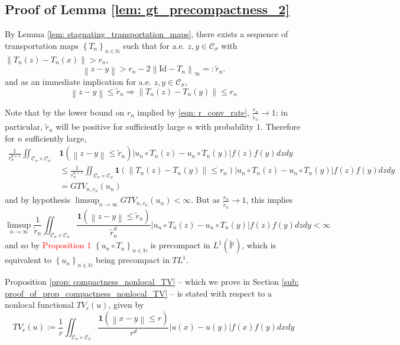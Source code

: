 \documentclass{article}
\newcommand{\norm}[1]{\left\lVert#1\right\rVert}
\newcommand{\abs}[1]{\left \lvert #1 \right \rvert}
\newcommand{\set}[1]{\left\{#1\right\}}
\newcommand{\seq}[1]{\set{#1}_{n \in \N}}
\newcommand{\N}{\mathbb{N}}
\newcommand{\Cset}{\mathcal{C}}
\newcommand{\Csig}{\Cset_{\sigma}}
\newcommand{\Pbb}{\mathbb{P}}
\newcommand{\1}{\mathbf{1}}
\theoremstyle{alden}
\theoremstyle{aldenthm}
\theoremstyle{remark}
\begin{document}
\subsection{Proof of Lemma \ref{lem: gt_precompactness_2}}
By Lemma \ref{lem: stagnating_transportation_maps}, there exists a sequence of transportation maps $\seq{T_n}$ such that for a.e. $z,y \in \Csig$ with $\norm{T_n(z) - T_n(x)} > r_n$,
\begin{equation*}
\norm{z - y} > r_n - 2 \norm{\mathrm{Id} - T_n}_{\infty} =: \widetilde{r}_n.
\end{equation*}
and as an immediate implication for a.e. $z,y \in \Csig$,
\begin{equation*}
\norm{z - y} \leq \widetilde{r}_n \Longrightarrow \norm{T_n(z) - T_n(y)} \leq r_n
\end{equation*}

Note that by the lower bound on $r_n$ implied by \eqref{eqn: r_conv_rate}, $\frac{r_n}{\widetilde{r}_n} \to 1$; in particular, $\widetilde{r}_n$ will be positive for sufficiently large $n$ with probability $1$. Therefore for $n$ sufficiently large,
\begin{align*}
\frac{1}{r_n^{d+1}} \iint_{\Csig \times \Csig} & \1(\norm{z - y} \leq \widetilde{r}_n) \abs{u_n \circ T_n(z) - u_n \circ T_n(y)} f(z) f(y) dz dy \\
& \leq \frac{1}{r_n^{d+1}} \iint_{\Csig \times \Csig} \1(\norm{T_n(z) - T_n(y)} \leq r_n) \abs{u_n \circ T_n(z) - u_n \circ T_n(y)} f(z) f(y) dz dy \\
& = GTV_{n,r_n}(u_n)
\end{align*} 
and by hypothesis $\limsup_{n \to \infty} GTV_{n,r_n}(u_n) < \infty$.  But as $\frac{r_n}{\widetilde{r}_n} \to 1$, this implies
\begin{equation*}
\limsup_{n \to \infty} \frac{1}{\widetilde{r}_n} \iint_{\Csig \times \Csig} \frac{\1(\norm{z - y} \leq \widetilde{r}_n)}{\widetilde{r}_n^d} \abs{u_n \circ T_n(z) - u_n \circ T_n(y)} f(z) f(y) dz dy < \infty
\end{equation*}
and so by \textcolor{red}{Proposition 1} $\seq{u_n \circ T_n}$ is precompact in $L^1(\widetilde{\Pbb})$, which is equivalent to $\seq{u_n}$ being precompact in $TL^1$. 

Proposition \ref{prop: compactness_nonlocal_TV} -- which we prove in Section \ref{sub: proof_of_prop_compactness_nonlocal_TV} --  is stated with respect to a nonlocal functional $TV_r(u)$, given by
\begin{equation*}
TV_r(u) := \frac{1}{r} \iint_{\Csig \times \Csig} \frac{\1(\norm{x - y} \leq r)}{r^d} \abs{u(x) - u(y)} f(x) f(y) dx dy
\end{equation*}
\end{document}
